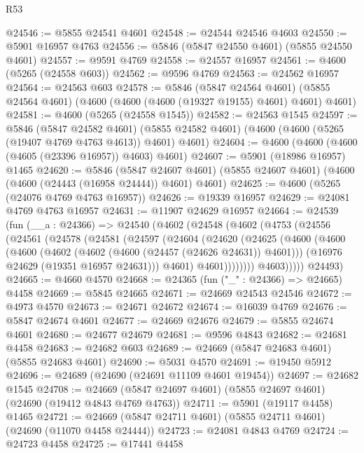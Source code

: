 \begin{lexlean}{R53}
\begin{coremodule}
@24546 := @5855 @24541 @4601
@24548 := @24544 @24546 @4603
@24550 := @5901 @16957 @4763
@24556 := @5846 (@5847 @24550 @4601) (@5855 @24550 @4601)
@24557 := @9591 @4769
@24558 := @24557 @16957
@24561 := @4600 (@5265 (@24558 @603))
@24562 := @9596 @4769
@24563 := @24562 @16957
@24564 := @24563 @603
@24578 := @5846
    (@5847 @24564 @4601)
    (@5855 @24564 @4601)
    (@4600 (@4600 (@4600 (@19327 @19155) @4601) @4601) @4601)
@24581 := @4600 (@5265 (@24558 @1545))
@24582 := @24563 @1545
@24597 := @5846
    (@5847 @24582 @4601)
    (@5855 @24582 @4601)
    (@4600 (@4600 (@5265 (@19407 @4769 @4763 @4613)) @4601) @4601)
@24604 := @4600 (@4600 (@4600 (@4605 (@23396 @16957)) @4603) @4601)
@24607 := @5901 (@18986 @16957) @1465
@24620 := @5846
    (@5847 @24607 @4601)
    (@5855 @24607 @4601)
    (@4600 (@4600 (@24443 (@16958 @24444)) @4601) @4601)
@24625 := @4600 (@5265 (@24076 @4769 @4763 @16957))
@24626 := @19339 @16957
@24629 := @24081 @4769 @4763 @16957
@24631 := @11907 @24629 @16957
@24664 := @24539
    (fun (__a : @24366) =>
    @24540
      (@4602
        (@24548
          (@4602
            (@4753
              (@24556
                (@24561
                  (@24578
                    (@24581
                      (@24597
                        (@24604
                          (@24620
                            (@24625
                              (@4600
                                (@4600
                                  (@4600
                                    (@4602 (@4602 (@4600 (@24457 (@24626 @24631)) @4601)))
                                    (@16976 @24629 (@19351 @16957 @24631)))
                                  @4601)
                                @4601))))))))
                @4603)))))
      @24493)
@24665 := @4660 @4570
@24668 := @24365 (fun ("_" : @24366) => @24665) @4458
@24669 := @5845 @24665
@24671 := @24669 @24543 @24546
@24672 := @4973 @4570
@24673 := @24671 @24672
@24674 := @16039 @4769
@24676 := @5847 @24674 @4601
@24677 := @24669 @24676
@24679 := @5855 @24674 @4601
@24680 := @24677 @24679
@24681 := @9596 @4843
@24682 := @24681 @4458
@24683 := @24682 @603
@24689 := @24669 (@5847 @24683 @4601) (@5855 @24683 @4601)
@24690 := @5031 @4570
@24691 := @19450 @5912
@24696 := @24689 (@24690 (@24691 @11109 @4601 @19454))
@24697 := @24682 @1545
@24708 := @24669 (@5847 @24697 @4601) (@5855 @24697 @4601) (@24690 (@19412 @4843 @4769 @4763))
@24711 := @5901 (@19117 @4458) @1465
@24721 := @24669 (@5847 @24711 @4601) (@5855 @24711 @4601) (@24690 (@11070 @4458 @24444))
@24723 := @24081 @4843 @4769
@24724 := @24723 @4458
@24725 := @17441 @4458

\end{coremodule}
\end{lexlean}
